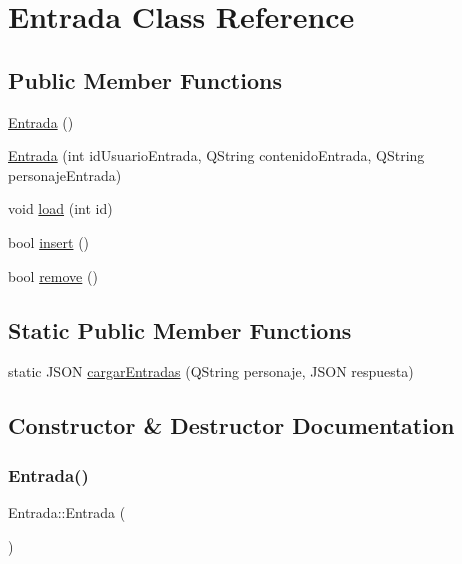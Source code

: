 \hypertarget{classEntrada}{}\section{Entrada Class Reference}
\label{classEntrada}
\subsection*{Public Member Functions}
\begin{DoxyCompactItemize}
\item 
\mbox{\hyperlink{classEntrada_a318ba6d0848d21cd2cf37d8dd3a4399e}{Entrada}} ()
\item 
\mbox{\hyperlink{classEntrada_acf29eef7e8989a95a2dbd34a0845893c}{Entrada}} (int id\+Usuario\+Entrada, Q\+String contenido\+Entrada, Q\+String personaje\+Entrada)
\item 
void \mbox{\hyperlink{classEntrada_a1b4cadcad1ba9665c73b3515eaad16cc}{load}} (int id)
\item 
bool \mbox{\hyperlink{classEntrada_af6ef4854f5d9040117278ffe65eac8a3}{insert}} ()
\item 
bool \mbox{\hyperlink{classEntrada_a352b5c6fad6fe043a06625c995b78e32}{remove}} ()
\end{DoxyCompactItemize}
\subsection*{Static Public Member Functions}
\begin{DoxyCompactItemize}
\item 
static J\+S\+ON \mbox{\hyperlink{classEntrada_ab9b65851bf7c933598f980c00106bf1e}{cargar\+Entradas}} (Q\+String personaje, J\+S\+ON respuesta)
\end{DoxyCompactItemize}


\subsection{Constructor \& Destructor Documentation}
\mbox{\label{classEntrada_a318ba6d0848d21cd2cf37d8dd3a4399e}} 
\subsubsection{\texorpdfstring{Entrada()}{Entrada()}\hspace{0.1cm}{\footnotesize\ttfamily [1/2]}}
{\footnotesize\ttfamily Entrada\+::\+Entrada (\begin{DoxyParamCaption}{ }\end{DoxyParamCaption})}

